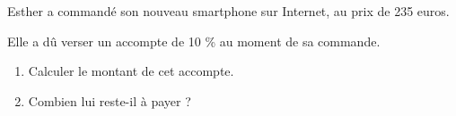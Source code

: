 \documentclass[exercice]{thedocument}%
\begin{document}
%
Esther a commandé son nouveau smartphone sur Internet, au prix de 235 euros.\par\noindent
Elle a dû verser un accompte de 10 \% au moment de sa commande.
\begin{enumerate}
    \item Calculer le montant de cet accompte.
    \item Combien lui reste-il à payer ?
\end{enumerate}
\end{document}
